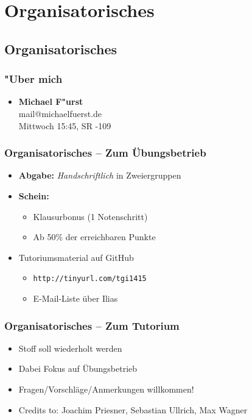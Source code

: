 

\section{Organisatorisches}

\subsection{Organisatorisches}

\begin{frame}
	\frametitle{"Uber mich}
	
	\begin{itemize}
		\item \textbf{Michael F"urst} \\ mail@michaelfuerst.de \\ Mittwoch 15:45, SR -109
	\end{itemize}
\end{frame}
\begin{frame}
	\frametitle{Organisatorisches -- Zum Übungsbetrieb}
	\begin{itemize}
		\item \textbf{Abgabe:} \emph{Handschriftlich} in Zweiergruppen
		\item \textbf{Schein:} 
		\begin{itemize}
			\item Klausurbonus (1 Notenschritt)
			\item Ab 50\% der erreichbaren Punkte
		\end{itemize}
		\item Tutoriumsmaterial auf GitHub
		\begin{itemize}
			\item \texttt{http://tinyurl.com/tgi1415}
			\item E-Mail-Liste über Ilias
		\end{itemize}
	\end{itemize}
\end{frame}
\begin{frame}
	\frametitle{Organisatorisches -- Zum Tutorium}
	\begin{itemize}
		\item Stoff soll wiederholt werden
		\item Dabei Fokus auf Übungsbetrieb
		\item Fragen/Vorschläge/Anmerkungen willkommen!
		
		\item Credits to: Joachim Priesner, Sebastian Ullrich, Max Wagner
	\end{itemize}
\end{frame}
